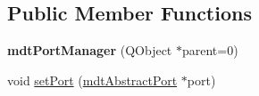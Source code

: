 \subsection*{Public Member Functions}
\begin{DoxyCompactItemize}
\item 
\hypertarget{classmdt_port_manager_a5ec36523089b7528d973e29cdbc64d01}{
{\bfseries mdtPortManager} (QObject $\ast$parent=0)}
\label{classmdt_port_manager_a5ec36523089b7528d973e29cdbc64d01}

\item 
\hypertarget{classmdt_port_manager_afcd156b2d0c9d340999935efb6cd8cb6}{
void \hyperlink{classmdt_port_manager_afcd156b2d0c9d340999935efb6cd8cb6}{setPort} (\hyperlink{classmdt_abstract_port}{mdtAbstractPort} $\ast$port)}
\label{classmdt_port_manager_afcd156b2d0c9d340999935efb6cd8cb6}


\end{DoxyCompactItemize}
